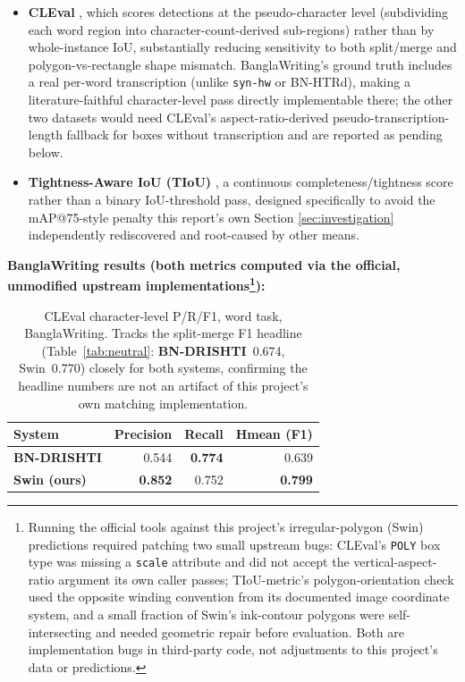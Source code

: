 \documentclass[11pt]{article}
\newcommand{\bnd}{\textbf{BN-DRISHTI}}
\begin{document}
\begin{itemize}[leftmargin=1.6em]
  \item \textbf{CLEval} \cite{baek2020cleval}, which scores detections at the
  pseudo-character level (subdividing each word region into character-count-derived
  sub-regions) rather than by whole-instance IoU, substantially reducing sensitivity to
  both split/merge and polygon-vs-rectangle shape mismatch. BanglaWriting's ground truth
  includes a real per-word transcription (unlike \texttt{syn-hw} or BN-HTRd), making a
  literature-faithful character-level pass directly implementable there; the other two
  datasets would need CLEval's aspect-ratio-derived pseudo-transcription-length fallback
  for boxes without transcription and are reported as pending below.
  \item \textbf{Tightness-Aware IoU (TIoU)} \cite{liu2019tiou}, a continuous
  completeness/tightness score rather than a binary IoU-threshold pass, designed
  specifically to avoid the mAP@75-style penalty this report's own Section
  \ref{sec:investigation} independently rediscovered and root-caused by other means.
\end{itemize}

\textbf{BanglaWriting results (both metrics computed via the official, unmodified
upstream implementations\footnote{Running the official tools against this project's
irregular-polygon (Swin) predictions required patching two small upstream bugs: CLEval's
\texttt{POLY} box type was missing a \texttt{scale} attribute and did not accept the
vertical-aspect-ratio argument its own caller passes; TIoU-metric's polygon-orientation
check used the opposite winding convention from its documented image coordinate system,
and a small fraction of Swin's ink-contour polygons were self-intersecting and needed
geometric repair before evaluation. Both are implementation bugs in third-party code, not
adjustments to this project's data or predictions.}):}

\begin{table}[H]
\centering
\caption{CLEval character-level P/R/F1, word task, BanglaWriting. Tracks the
split-merge F1 headline (Table~\ref{tab:neutral}: \bnd{}~0.674, Swin~0.770) closely for
both systems, confirming the headline numbers are not an artifact of this project's own
matching implementation.}
\label{tab:cleval_banglawriting}
\footnotesize
\begin{tabular}{@{}lrrr@{}}
\toprule
System & Precision & Recall & Hmean (F1) \\
\midrule
\bnd{}         & 0.544 & \textbf{0.774} & 0.639 \\
\textbf{Swin (ours)} & \textbf{0.852} & 0.752 & \textbf{0.799} \\
\bottomrule
\end{tabular}
\end{table}
\end{document}
